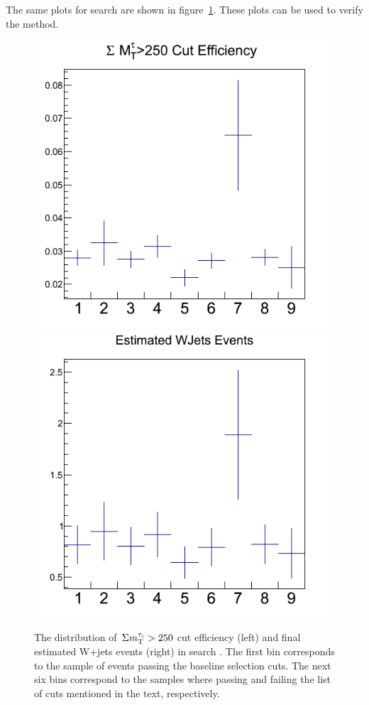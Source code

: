 The same plots for search \bintwo are shown in figure~\ref{fig:wjets_2}. These plots can be used to verify the method. 
\begin{figure}[iHhtb]
\centering
\includegraphics[angle=0,scale=0.35]{TauTauFigs/eff_bin2.png}
\includegraphics[angle=0,scale=0.35]{TauTauFigs/est_bin2.png} \\
\caption{The distribution of $\,\Sigma m_{\rm T}^{\tau_i}>250$ cut 
efficiency (left) and final estimated W+jets events (right) in search \bintwo.
 The first bin corresponds to the sample of events passing the baseline selection cuts. 
The next six bins correspond to the samples where passing and failing the 
list of cuts mentioned in the text, respectively.}
\label{fig:wjets_2}
\end{figure}

